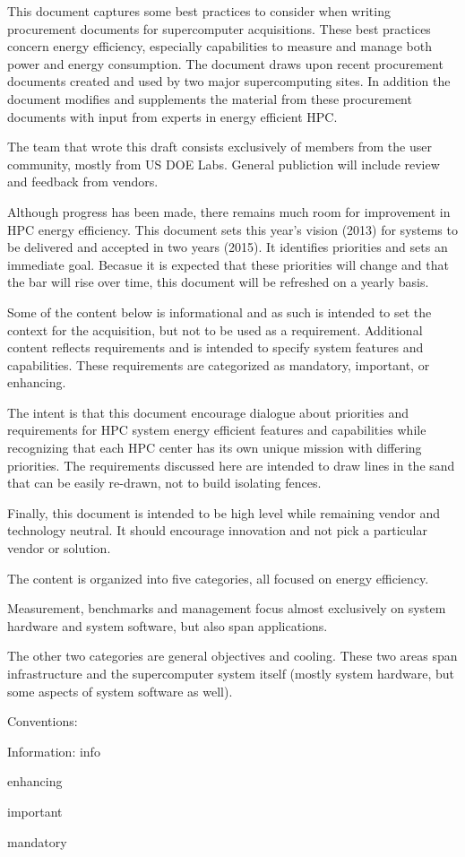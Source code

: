 This document captures some best practices to consider when writing procurement documents for supercomputer acquisitions. These best practices concern energy efficiency, especially capabilities to measure and manage both power and energy consumption. The document draws upon recent procurement documents created and used by two major supercomputing sites. In addition the document modifies and supplements the material from these procurement documents with input from experts in energy efficient HPC.
 
The team that wrote this draft consists exclusively of members from the user community, mostly from US DOE Labs.  General publiction will include review and feedback from vendors.

Although  progress has been made, there remains much room for improvement in HPC energy efficiency. This document sets this year’s vision (2013) for systems to be delivered and accepted in two years (2015). It identifies priorities and sets an immediate goal.  Becasue it is expected that these priorities will change and that the bar will rise over time, this document will be refreshed on a yearly basis.

Some of the content below is informational and as such is intended to set the context for the acquisition, but not to be used as a requirement.  Additional content reflects requirements and is intended to specify system features and capabilities.  These requirements are categorized as mandatory, important, or enhancing.

The intent is that this document encourage dialogue about priorities and requirements for HPC system energy efficient features and capabilities while recognizing that each HPC center has its own unique mission with differing priorities. The requirements discussed here are intended to draw lines in the sand that can be easily re-drawn, not to build isolating fences.
 
Finally, this document is intended to be high level while remaining vendor and technology neutral.  It should encourage innovation and not pick a particular vendor or solution.

The content is organized into five categories, all focused on energy efficiency.  

Measurement, benchmarks and management focus almost exclusively on system hardware and system software, but also span applications.  

The other two categories are general objectives and cooling.  These two areas span infrastructure and the supercomputer system itself (mostly system hardware, but some aspects of system software as well).

Conventions:

Information: info

\begin{packed_enum}
\item
enhancing
\item
important
\item
mandatory
\end{packed_enum}